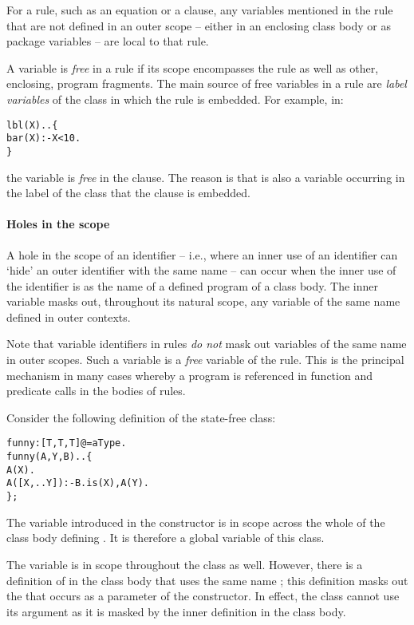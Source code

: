 For a rule, such as an equation or a clause, any variables mentioned in the rule that are not defined in an outer scope -- either in an enclosing class body or as package variables -- are local to that rule.

A variable is \emph{free} in a rule if its scope encompasses the rule as well as other, enclosing, program fragments. The main source of free variables in a rule are \emph{label variables} of the class in which the rule is embedded. For example, in:
\begin{alltt}
lbl(X)..\{
  bar(X) :- X<10.
\}
\end{alltt}
the variable  is \emph{free} in the  clause. The reason is that  is also a variable occurring in the label  of the class that the  clause is embedded.


\paragraph{Holes in the scope}
A hole in the scope of an identifier  -- i.e., where an inner use of an identifier can `hide' an outer identifier with the same name -- can occur when the inner use of the identifier is as the name of a defined program of a class body.  The inner variable masks out, throughout its natural scope,  any variable of the same name defined in outer contexts. 

Note that variable identifiers in rules \emph{do not} mask out variables of the same name in outer scopes.  Such a variable is a \emph{free} variable of the rule. This is the principal mechanism in many cases whereby a program is referenced in function and predicate calls in the bodies of rules.

Consider the following definition of the state-free class:
\begin{alltt}
funny:[T,T,T] @= aType.
funny(A,Y,B)..\{
  A(X).
  A([X,..Y]) :- B.is(X),A(Y).
\};
\end{alltt}
The variable  introduced in the  constructor is in scope across the whole of the class body defining . It is therefore a global variable of this class. 

The variable  is in scope throughout the class as well. However, there is a definition of  in the class body that uses the same name ; this definition masks out the  that occurs as a parameter of the  constructor.  In effect, the  class cannot use its  argument as it is masked by the inner  definition in the class body.

